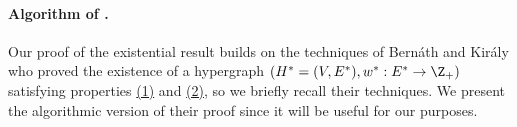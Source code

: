 \documentclass{article}
\def\Cref#1{<#1>}%
\newcommand{\maximalTightSetFamily}[1]{\ensuremath{\calT_{#1}}\xspace}
\newcommand{\shubhang}[1]{{\color{blue}[{\tiny Shubhang: \bf #1}]\marginpar{\color{blue}*}}}
\begin{document}



\paragraph{Algorithm of \cite{Bernath-Kiraly}.} Our proof of the existential result builds on the techniques of Bern\'{a}th and Kir\'{a}ly \cite{Bernath-Kiraly} who proved the existence of a hypergraph $(H^*=(V, E^*), w^*: E^*\rightarrow \Z_+)$ satisfying properties \hyperlink{WeakToStrong(1)}{(1)} and \hyperlink{WeakToStrong(2)}{(2)}, so we briefly recall their techniques. 
We present the algorithmic version of their proof since it will be useful for our purposes. 
\end{document}
